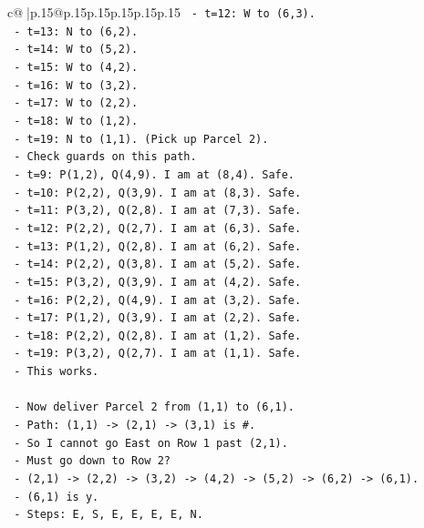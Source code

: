\documentclass{article}
\begin{document}
{\begin{supertabular}{c@{$\;$}|p{.15\linewidth}@{}p{.15\linewidth}p{.15\linewidth}p{.15\linewidth}p{.15\linewidth}p{.15\linewidth}}
{{{\texttt{    {-} t=12: W to (6,3).} \\
\texttt{    {-} t=13: N to (6,2).} \\
\texttt{    {-} t=14: W to (5,2).} \\
\texttt{    {-} t=15: W to (4,2).} \\
\texttt{    {-} t=16: W to (3,2).} \\
\texttt{    {-} t=17: W to (2,2).} \\
\texttt{    {-} t=18: W to (1,2).} \\
\texttt{    {-} t=19: N to (1,1). (Pick up Parcel 2).} \\
\texttt{  {-} Check guards on this path.} \\
\texttt{    {-} t=9: P(1,2), Q(4,9). I am at (8,4). Safe.} \\
\texttt{    {-} t=10: P(2,2), Q(3,9). I am at (8,3). Safe.} \\
\texttt{    {-} t=11: P(3,2), Q(2,8). I am at (7,3). Safe.} \\
\texttt{    {-} t=12: P(2,2), Q(2,7). I am at (6,3). Safe.} \\
\texttt{    {-} t=13: P(1,2), Q(2,8). I am at (6,2). Safe.} \\
\texttt{    {-} t=14: P(2,2), Q(3,8). I am at (5,2). Safe.} \\
\texttt{    {-} t=15: P(3,2), Q(3,9). I am at (4,2). Safe.} \\
\texttt{    {-} t=16: P(2,2), Q(4,9). I am at (3,2). Safe.} \\
\texttt{    {-} t=17: P(1,2), Q(3,9). I am at (2,2). Safe.} \\
\texttt{    {-} t=18: P(2,2), Q(2,8). I am at (1,2). Safe.} \\
\texttt{    {-} t=19: P(3,2), Q(2,7). I am at (1,1). Safe.} \\
\texttt{  {-} This works.} \\
\\ 
\texttt{  {-} Now deliver Parcel 2 from (1,1) to (6,1).} \\
\texttt{    {-} Path: (1,1) {-}> (2,1) {-}> (3,1) is \#.} \\
\texttt{    {-} So I cannot go East on Row 1 past (2,1).} \\
\texttt{    {-} Must go down to Row 2?} \\
\texttt{      {-} (2,1) {-}> (2,2) {-}> (3,2) {-}> (4,2) {-}> (5,2) {-}> (6,2) {-}> (6,1).} \\
\texttt{      {-} (6,1) is y.} \\
\texttt{    {-} Steps: E, S, E, E, E, E, N.} \\
}}}
\end{supertabular}}
\end{document}

